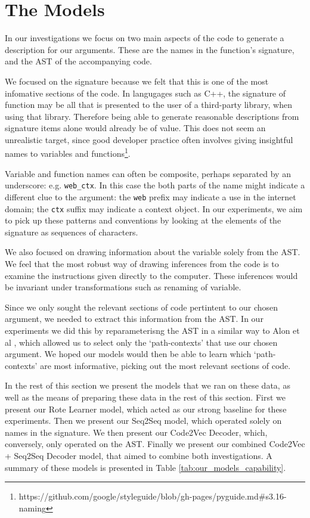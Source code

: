 \chapter{The Models}
\label{the_models}

In our investigations we focus on two main aspects of the code to generate a description for our arguments. 
These are the names in the function's signature, and the AST of the accompanying code. 

We focused on the signature because we felt that this is one of the most infomative sections of the code. 
In langugages such as C++, the signature of function may be all that is presented to the user of a third-party library, when using that library. 
Therefore being able to generate reasonable descriptions from signature items alone would already be of value. 
This does not seem an unrealistic target, since good developer practice often involves giving insightful names to variables and functions\footnote{https://github.com/google/styleguide/blob/gh-pages/pyguide.md\#s3.16-naming}.

Variable and function names can often be composite, perhaps separated by an underscore: e.g. \texttt{web_ctx}. 
In this case the both parts of the name might indicate a different clue to the argument:  the  \texttt{web} prefix may indicate a use in the internet domain; the \texttt{ctx} suffix may indicate a context object. 
In our experiments, we aim to pick up these patterns and conventions by looking at the elements of the signature as sequences of characters.

We also focused on drawing information about the variable solely from the AST. We feel that the most robust way of drawing inferences from the code is to examine the instructions given directly to the computer. 
These inferences would be invariant under transformations such as renaming of variable. 

Since we only sought the relevant sections of code pertintent to our chosen argument, we needed to extract this information from the AST. 
In our experiments we did this by reparameterisng the AST in a similar way to Alon et al \cite{alon_general_2018}, which allowed us to select only the `path-contexts' that use our chosen argument. 
We hoped our models would then be able to learn which `path-contexts' are most informative, picking out the most relevant sections of code.

In the rest of this section we present the models that we ran on these data, as well as the means of preparing these data in the rest of this section. First we present our Rote Learner model, which acted as our strong baseline for these experiments. Then we present our Seq2Seq model, which operated solely on names in the signature. We then present our Code2Vec Decoder, which, conversely, only operated on the AST. Finally we present our combined Code2Vec + Seq2Seq Decoder model, that aimed to combine both investigations. A summary of these models is presented in Table \ref{tab:our_models_capability}.


